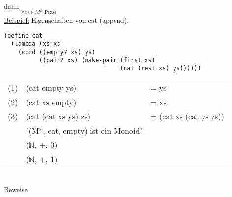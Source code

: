 \documentclass[a4paper,12pt]{article}
\begin{document}
dann $\underset{\forall xs \in M* :\text{P(xs)}}{}$\\

\uline{Beispiel:} Eigenschaften von cat (append).
\begin{lstlisting}[style=customc]
(define cat
  (lambda (xs xs
    (cond ((empty? xs) ys)
          ((pair? xs) (make-pair (first xs)
                                 (cat (rest xs) ys))))))
\end{lstlisting}

\begin{tabular}{lll}
(1) & (cat empty ys) &= ys\\
(2) & (cat xs empty) &= xs\\
(3) & (cat (cat xs ys) zs) &= (cat xs (cat ys zs))\\
    & "(M*, cat, empty) ist ein Monoid" & \\
    & ($\mathbb{N}$, +, 0) &\\
    & ($\mathbb{N}$, +, 1) & \\
    
\end{tabular}\\
\uline{Beweise}
\end{document}
